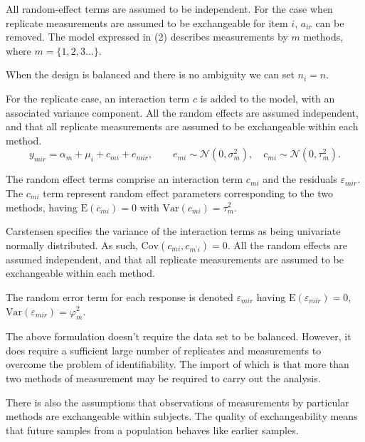 \documentclass[12pt, a4paper]{report}
\theoremstyle{plain}
\theoremstyle{definition}
\theoremstyle{remark}
\begin{document}
All random-effect terms are assumed to be independent. For the case when replicate measurements are assumed to be exchangeable for item $i$, $a_{ir}$ can be removed. The model expressed in (2) describes measurements by $m$ methods, where $m = \{1,2,3\ldots\}$. 

When the design is balanced and there is no ambiguity we can set $n_i=n$.

For the replicate case, an interaction term $c$ is added to the model, with an associated variance component. All the random effects are assumed independent, and that all replicate measurements are assumed to be exchangeable within each method.
\begin{equation}
y_{mir}  = \alpha_{m} + \mu_{i} + c_{mi} + e_{mir}, \qquad  e_{mi}
\sim \mathcal{N}(0,\sigma^{2}_{m}), \quad c_{mi} \sim \mathcal{N}(0,\tau^{2}_{m}).
\end{equation}


The random effect terms comprise an interaction term $c_{mi}$ and the residuals $\varepsilon_{mir}$. The $c_{mi}$ term represent random effect parameters corresponding to the two methods, having $\mathrm{E}(c_{mi})= 0$ with $\mathrm{Var}(c_{mi})=\tau^2_m$.  

Carstensen specifies the variance of the interaction terms as being univariate normally distributed. As such, $\mathrm{Cov}(c_{mi}, c_{m^\prime i})= 0.$ All the random effects are assumed independent, and that all replicate measurements are assumed to be exchangeable within each method.

The random error term for each response is denoted $\varepsilon_{mir}$ having $\mathrm{E}(\varepsilon_{mir})=0$, $\mathrm{Var}(\varepsilon_{mir})=\varphi^2_m$. 


The above formulation doesn't require the data set to be balanced. However, it does require a sufficient large number of replicates and measurements to overcome the problem of identifiability. The import of which is that more than two methods of measurement may be required to carry out the analysis. 

There is also the assumptions that observations of measurements by particular methods are exchangeable within subjects. The quality of exchangeability means that future samples from a population behaves like earlier samples.

\end{document}
